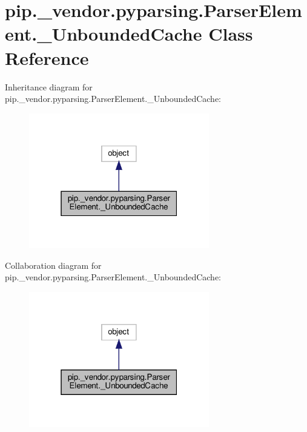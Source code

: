 \hypertarget{classpip_1_1__vendor_1_1pyparsing_1_1ParserElement_1_1__UnboundedCache}{}\section{pip.\+\_\+vendor.\+pyparsing.\+Parser\+Element.\+\_\+\+Unbounded\+Cache Class Reference}
\label{classpip_1_1__vendor_1_1pyparsing_1_1ParserElement_1_1__UnboundedCache}


Inheritance diagram for pip.\+\_\+vendor.\+pyparsing.\+Parser\+Element.\+\_\+\+Unbounded\+Cache\+:
\nopagebreak
\begin{figure}[H]
\begin{center}
\leavevmode
\includegraphics[width=223pt]{classpip_1_1__vendor_1_1pyparsing_1_1ParserElement_1_1__UnboundedCache__inherit__graph}
\end{center}
\end{figure}


Collaboration diagram for pip.\+\_\+vendor.\+pyparsing.\+Parser\+Element.\+\_\+\+Unbounded\+Cache\+:
\nopagebreak
\begin{figure}[H]
\begin{center}
\leavevmode
\includegraphics[width=223pt]{classpip_1_1__vendor_1_1pyparsing_1_1ParserElement_1_1__UnboundedCache__coll__graph}
\end{center}
\end{figure}
